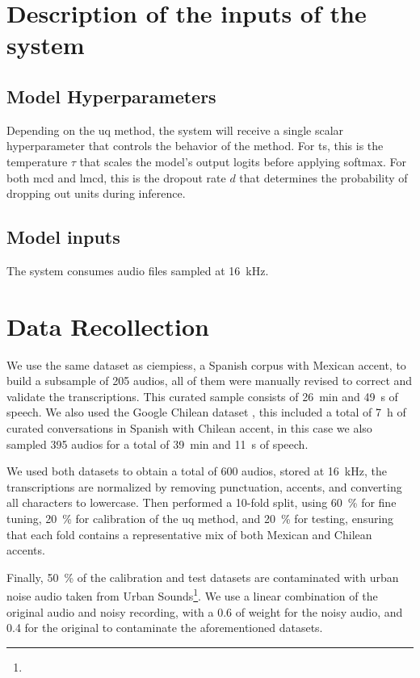 \section{Description of the inputs of the system}

\subsection{Model Hyperparameters}
Depending on the \acrshort{uq} method, the system will receive a single scalar hyperparameter that controls the behavior of the method. For \acrshort{ts}, this is the temperature $\tau$ that scales the model's output logits before applying softmax. For both \acrshort{mcd} and \acrshort{lmcd}, this is the dropout rate $d$ that determines the probability of dropping out units during inference.

\subsection{Model inputs}
The system consumes audio files sampled at \qty{16}{\kilo\hertz}.


\section{Data Recollection}

We use the same dataset as \cite{rodriguez2024uncertainty} \acrfull{ciempiess}\cite{hernandez2017automatic}, a Spanish corpus with Mexican accent, to build a subsample of 205 audios, all of them were manually revised to correct and validate the transcriptions. This curated sample consists of \qty{26}{\minute} and \qty{49}{\second} of speech.
We also used the Google Chilean dataset \cite{guevara-rukoz-etal-2020-crowdsourcing}, this included a total of \qty{7}{\hour} of curated conversations in Spanish with Chilean accent, in this case we also sampled 395 audios for a total of \qty{39}{\minute} and \qty{11}{\second} of speech.

We used both datasets to obtain a total of 600 audios, stored at \qty{16}{\kilo\hertz}, the transcriptions are normalized by removing punctuation, accents, and converting all characters to lowercase. Then performed a 10-fold split, using \qty{60}{\percent} for fine tuning, \qty{20}{\percent} for calibration of the \acrshort{uq} method, and \qty{20}{\percent} for testing, ensuring that each fold contains a representative mix of both Mexican and Chilean accents.

Finally, \SI{50}{\percent} of the calibration and test datasets are contaminated with urban noise audio taken from Urban Sounds\footnote{}. We use a linear combination of the original audio and noisy recording, with a 0.6 of weight for the noisy audio, and 0.4 for the original to contaminate the aforementioned datasets.

